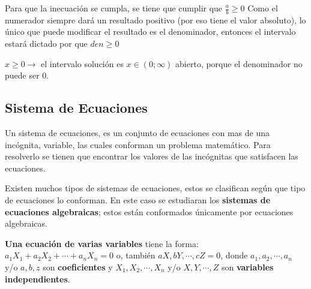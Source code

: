     Para que la inecuación se cumpla, se tiene que cumplir que $ \frac{a}{b} \geq 0 $
    Como el numerador siempre dará un resultado positivo (por eso tiene el valor
    absoluto), lo único que puede modificar el resultado es el denominador, entonces
    el intervalo estará dictado por que $ den \geq 0 $

    $ x\geq 0 \rightarrow$ el intervalo solución es $ x \in (0;\infty) $
    abierto, porque el denominador no puede ser 0.

    \vspace*{1cm}


\subsection{Sistema de Ecuaciones}

    Un sistema de ecuaciones, es un conjunto de ecuaciones con mas de una
    incógnita, variable, las cuales conforman un problema matemático. Para
    resolverlo se tienen que encontrar los valores de las incógnitas que satisfacen
    las ecuaciones.

    Existen muchos tipos de sistemas de ecuaciones, estos se clasifican según
    que tipo de ecuaciones lo conforman. En este caso se estudiaran los \textbf{
    sistemas de ecuaciones algebraicas}; estos están conformados únicamente por
    ecuaciones algebraicas.

    \textbf{Una ecuación de varias variables} tiene la forma:
    $ a_1X_1+a_2X_2+\cdots+a_nX_n = 0 $ o, también $aX,bY,\cdots,cZ=0$, donde
    $a_1,a_2,\cdots,a_n$ y/o $a,b,z$ son \textbf{coeficientes} y $X_1,X_2,\cdots,X_n$
    y/o $X,Y,\cdots,Z$ son \textbf{variables independientes}.

